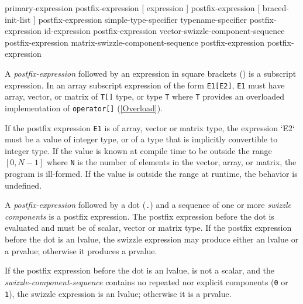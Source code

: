 
\begin{grammar}
  \br
  primary-expression\br
  postfix-expression [ expression ]\br
  postfix-expression [ braced-init-list ]\br %
  postfix-expression \terminal{(}  \terminal{)}\br
  simple-type-specifier \terminal{(}  \terminal{)}\br
  typename-specifier \terminal{(}  \terminal{)}\br
  postfix-expression   id-expression\br
  postfix-expression  vector-swizzle-component-sequence\br
  postfix-expression  matrix-swizzle-component-sequence\br
  postfix-expression \terminal{++}\br
  postfix-expression \terminal{--}
\end{grammar}


\p A \textit{postfix-expression} followed by an expression in square brackets
(\texttt{\lbrack \rbrack}) is a subscript expression. In an array subscript
expression of the form \texttt{E1[E2]}, \texttt{E1} must have array, vector, or
matrix of \texttt{T[]} type, or type \texttt{T} where \texttt{T} provides an
overloaded implementation of \texttt{operator[]} (\ref{Overload}).

\p If the postfix expression \texttt{E1} is of array, vector or matrix type, the
expression `E2` must be a value of integer type, or of a type that is
implicitly convertible to integer type. If the value is known at compile
time to be outside the range \([0, N-1]\) where \texttt{N} is the number of
elements in the vector, array, or matrix, the program is ill-formed. If the
value is outside the range at runtime, the behavior is undefined.


\p A \textit{postfix-expression} followed by a dot (\texttt{.}) and a sequence
of one or more \textit{swizzle components} is a postfix expression. The postfix
expression before the dot is evaluated and must be of scalar, vector or matrix
type. If the postfix expression before the dot is an lvalue, the swizzle
expression may produce either an lvalue or a prvalue; otherwise it produces a
prvalue.

\p If the postfix expression before the dot is an lvalue, is not a scalar, and
the \textit{swizzle-component-sequence} contains no repeated nor explicit
components (\texttt{0} or \texttt{1}), the swizzle expression is an lvalue;
otherwise it is a prvalue.

